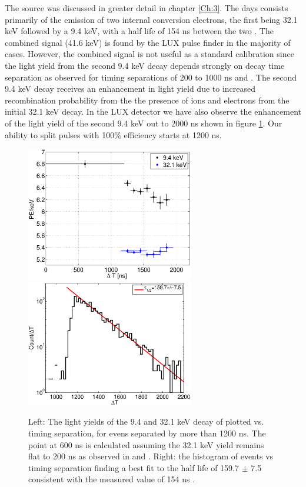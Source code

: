 
The \KrCal source was discussed in greater detail in chapter \ref{Ch:3}. The days consists primarily of the emission of two internal conversion electrons, the first being 32.1 keV followed by a 9.4 keV, with a half life of 154 ns between the two \cite{Kastens} \cite{83Kr_HalfLife_1} \cite{83Kr_HalfLife_2} . The combined signal (41.6 keV) is found by the LUX pulse finder in the majority of cases. However, the combined signal is not useful as a standard calibration since the light yield from the second 9.4 keV decay depends strongly on decay time separation as observed for timing separations of 200 to 1000 ns \cite{Kastens} and \cite{Baudis}. The second 9.4 keV decay receives an enhancement in light yield due to increased recombination probability from the the presence of ions and electrons from the initial 32.1 keV decay. In the LUX detector we have also observe the enhancement of the light yield of the second 9.4 keV out to 2000 ns shown in figure \ref{fig:Yield_Kr9}. Our ability to split pulses with 100\% efficiency starts at 1200 ns.

 \begin{figure}[h!]\centering
\includegraphics[width=73mm]{Chapter_Flucs/Figures/Kr/dT_lux10_20130510T1250_cp09323} %
\includegraphics[width=73mm]{Chapter_Flucs/Figures/Kr/dT_fit_lux10_20130510T1250}
\caption{Left: The light yields of the 9.4 and 32.1 keV decay of \KrCal plotted vs. timing separation, for evens separated by more than 1200 ns. The point at 600 ns is calculated assuming the 32.1 keV yield remains flat to 200 ns as observed in \cite{Kastens} and \cite{Baudis} . Right: the histogram of \KrCal events vs timing separation finding a best fit to the half life of 159.7 $\pm$ 7.5 consistent with the measured value of 154 ns \cite{83Kr_HalfLife_1} \cite{83Kr_HalfLife_2}. }
\label{fig:Yield_Kr9}
\end{figure}

